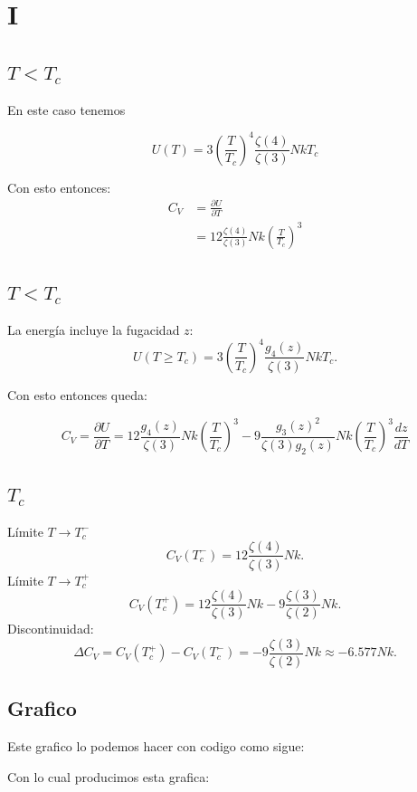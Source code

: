 \documentclass{report}
\begin{document}
\section{I}

\subsection{$T < T_c$}

En este caso tenemos

\[
  U(T) = 3 \left( \frac{T}{T_c} \right)^4 \frac{\zeta(4)}{\zeta(3)} NkT_c
\]

Con esto entonces:
\begin{align*}
  C_V &= \frac{\partial U}{\partial T}\\
  &= 12\frac{\zeta(4)}{\zeta(3)}Nk\left(\frac{T}{T_c}\right)^3
\end{align*}

\subsection{$T < T_c$}

La energía incluye la fugacidad \( z \):  
\[
U(T \geq T_c) = 3 \left( \frac{T}{T_c} \right)^4 \frac{g_4(z)}{\zeta(3)} N k T_c.
\]  

Con esto entonces queda:

\[
  C_V = \frac{\partial U}{\partial T} = 12 \frac{g_4(z)}{\zeta(3)} N k \left( \frac{T}{T_c} \right)^3 - 9 \frac{g_3(z)^2}{\zeta(3) g_2(z)} N k \left( \frac{T}{T_c} \right)^3 \frac{dz}{dT}
\]


\subsection{$T_c$}

Límite \( T \to T_c^- \)
  \[
  C_V(T_c^-) = 12 \frac{\zeta(4)}{\zeta(3)} N k.
  \]  
Límite \( T \to T_c^+ \)
  \[
  C_V(T_c^+) = 12 \frac{\zeta(4)}{\zeta(3)} N k - 9 \frac{\zeta(3)}{\zeta(2)} N k.
  \]  
Discontinuidad:
  \[
  \Delta C_V = C_V(T_c^+) - C_V(T_c^-) = -9 \frac{\zeta(3)}{\zeta(2)} N k \approx -6.577 N k.
  \]

\subsection{Grafico}

Este grafico lo podemos hacer con codigo como sigue:


Con lo cual producimos esta grafica:
\end{document}
